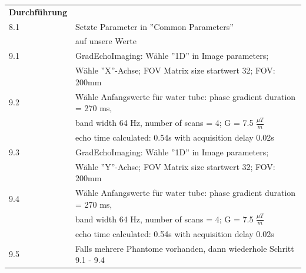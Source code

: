 \begin{tabular}{ll}
    \textbf{Durchführung} & \\

    8.1 & Setzte Parameter in ''Common Parameters''  \\

        &  auf unsere Werte \\

    9.1 & GradEchoImaging: Wähle  ''1D'' in Image parameters;  \\

        & Wähle ''X''-Achse; FOV Matrix size startwert 32; FOV: 200mm \\

    9.2 & Wähle Anfangswerte für water tube: phase gradient duration = 270 ms,  \\

        & band width 64 Hz, number of scans = 4; G = 7.5 $\frac{\mu T}{m}$ \\

        & echo time calculated: 0.54s with acquisition delay 0.02s \\

    9.3 & GradEchoImaging: Wähle  ''1D'' in Image parameters;  \\

        & Wähle ''Y''-Achse; FOV Matrix size startwert 32; FOV: 200mm \\

    9.4 & Wähle Anfangswerte für water tube: phase gradient duration = 270 ms,  \\

        & band width 64 Hz, number of scans = 4; G = 7.5 $\frac{\mu T}{m}$ \\

        & echo time calculated: 0.54s with acquisition delay 0.02s \\

    9.5 & Falls mehrere Phantome vorhanden, dann wiederhole Schritt 9.1 - 9.4 \\

\end{tabular}  


